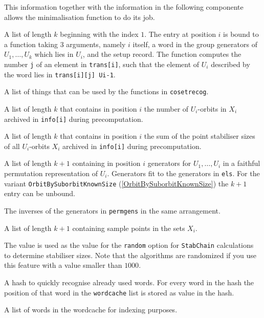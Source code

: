 \documentclass[a4paper,11pt]{report}
\begin{document}
{{{\begin{description}
 This information together with the information in the following componente
allows the minimalisation function to do its job. 
\item[{\texttt{cosetrecog}}]  A list of length $k$ beginning with the index $1$. The entry at position $i$ is bound to a function taking $3$ arguments, namely $i$ itself, a word in the group generators of $U_1, \ldots, U_k$ which lies in $U_i$, and the setup record. The function computes the number \texttt{j} of an element in \texttt{trans[i]}, such that the element of $U_i$ described by the word lies in \texttt{trans[i][j]
U{\textunderscore}\texttt{}\texttt{}i-1\texttt{}\texttt{}}. 
\item[{\texttt{cosetinfo}}]  A list of things that can be used by the functions in \texttt{cosetrecog}. 
\item[{\texttt{suborbnr}}]  A list of length $k$ that contains in position $i$ the number of $U_i$-orbits in $X_i$ archived in \texttt{info[i]} during precomputation. 
\item[{\texttt{sumstabl}}]  A list of length $k$ that contains in position $i$ the sum of the point stabiliser sizes of all $U_i$-orbits $X_i$ archived in \texttt{info[i]} during precomputation. 
\item[{\texttt{permgens}}]  A list of length $k+1$ containing in position $i$ generators for $U_1, \ldots, U_i$ in a faithful permutation representation of $U_i$. Generators fit to the generators in \texttt{els}. For the variant \texttt{OrbitBySuborbitKnownSize} (\ref{OrbitBySuborbitKnownSize}) the $k+1$ entry can be unbound. 
\item[{\texttt{permgensinv}}]  The inverses of the generators in \texttt{permgens} in the same arrangement. 
\item[{\texttt{sample}}]  A list of length $k+1$ containing sample points in the sets $X_i$. 
\item[{\texttt{stabchainrandom}}]  The value is used as the value for the \texttt{random} option for \texttt{StabChain} calculations to determine stabiliser sizes. Note that the algorithms are
randomized if you use this feature with a value smaller than $1000$. 
\item[{\texttt{wordhash}}]  A hash to quickly recognise already used words. For every word in the hash the
position of that word in the \texttt{wordcache} list is stored as value in the hash. 
\item[{\texttt{wordcache}}]  A list of words in the wordcache for indexing purposes. 

\end{description}}}}
\end{document}
